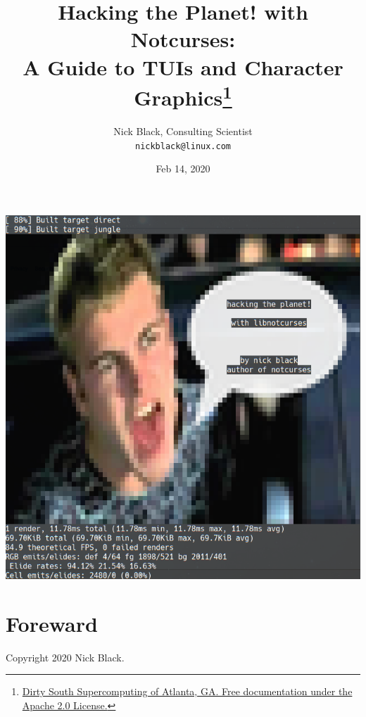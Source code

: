\documentclass[letterpaper,10pt]{article}
\title{Hacking the Planet! with Notcurses:\\
A Guide to TUIs and Character Graphics\thanks{
 \href{https://www.dsscaw.com/}{Dirty South Supercomputing of Atlanta, GA. Free documentation under the Apache 2.0 License.}
}\\
}
\author{Nick Black, Consulting Scientist\\
\texttt{nickblack@linux.com}
}
\begin{document}
\date{Feb 14, 2020}
\maketitle
\date{}
\vspace{1in}
\begin{center}
\includegraphics[width=.75\linewidth]{htp-with-notcurses.png}
\end{center}
\thispagestyle{empty}

\clearpage
{}


\tableofcontents

\section{Foreward}
Copyright 2020 Nick Black.
\end{document}
